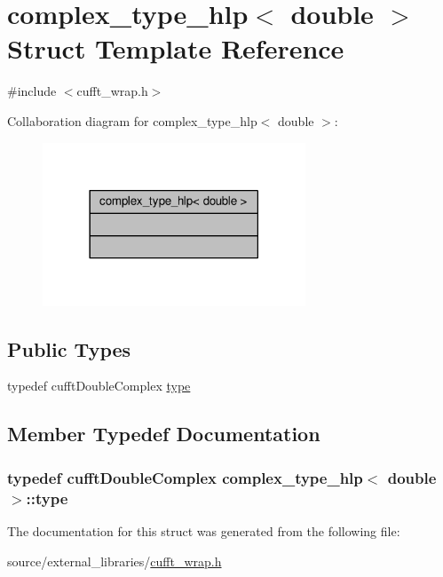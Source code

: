 \hypertarget{structcomplex__type__hlp_3_01double_01_4}{\section{complex\-\_\-type\-\_\-hlp$<$ double $>$ Struct Template Reference}
\label{structcomplex__type__hlp_3_01double_01_4}
}


{\ttfamily \#include $<$cufft\-\_\-wrap.\-h$>$}



Collaboration diagram for complex\-\_\-type\-\_\-hlp$<$ double $>$\-:
\nopagebreak
\begin{figure}[H]
\begin{center}
\leavevmode
\includegraphics[width=222pt]{structcomplex__type__hlp_3_01double_01_4__coll__graph}
\end{center}
\end{figure}
\subsection*{Public Types}
\begin{DoxyCompactItemize}
\item 
typedef cufft\-Double\-Complex \hyperlink{structcomplex__type__hlp_3_01double_01_4_ab7bf6a2f6317b455665124fe54c356e2}{type}
\end{DoxyCompactItemize}


\subsection{Member Typedef Documentation}
\hypertarget{structcomplex__type__hlp_3_01double_01_4_ab7bf6a2f6317b455665124fe54c356e2}{
\subsubsection[{type}]{\setlength{\rightskip}{0pt plus 5cm}typedef cufft\-Double\-Complex {\bf complex\-\_\-type\-\_\-hlp}$<$ double $>$\-::{\bf type}}}\label{structcomplex__type__hlp_3_01double_01_4_ab7bf6a2f6317b455665124fe54c356e2}


The documentation for this struct was generated from the following file\-:\begin{DoxyCompactItemize}
\item 
source/external\-\_\-libraries/\hyperlink{cufft__wrap_8h}{cufft\-\_\-wrap.\-h}\end{DoxyCompactItemize}
